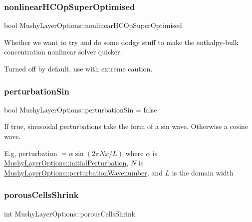 \subsubsection{\texorpdfstring{nonlinear\+H\+C\+Op\+Super\+Optimised}{nonlinearHCOpSuperOptimised}}
{\footnotesize\ttfamily bool Mushy\+Layer\+Options\+::nonlinear\+H\+C\+Op\+Super\+Optimised}



Whether we want to try and do some dodgy stuff to make the enthalpy-\/bulk concentration nonlinear solver quicker. 

Turned off by default, use with extreme caution. \mbox{\label{struct_mushy_layer_options_ae7dba5b6442e8a93cbecac967a1b1d1c}} 
\subsubsection{\texorpdfstring{perturbation\+Sin}{perturbationSin}}
{\footnotesize\ttfamily bool Mushy\+Layer\+Options\+::perturbation\+Sin = false}



If true, sinusoidal perturbations take the form of a sin wave. Otherwise a cosine wave. 

E.\+g, perturbation $ = \alpha \sin (2 \pi N x / L) $ where $\alpha$ is \hyperlink{struct_mushy_layer_options_a1ce91441dbd9727f45134ef8fdb64018}{Mushy\+Layer\+Options\+::initial\+Perturbation}, $ N $ is \hyperlink{struct_mushy_layer_options_a62029abc276b13b7a1be2d93a02d0c4c}{Mushy\+Layer\+Options\+::perturbation\+Wavenumber}, and $ L $ is the domain width \mbox{\label{struct_mushy_layer_options_adf46ef76ff864b7fa57f69977e9a81d8}} 
\subsubsection{\texorpdfstring{porous\+Cells\+Shrink}{porousCellsShrink}}
{\footnotesize\ttfamily int Mushy\+Layer\+Options\+::porous\+Cells\+Shrink}



